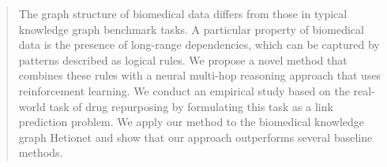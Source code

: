 \documentclass{article}
\begin{document}
\printAffiliationsAndNotice{\icmlEqualContribution} %


\begin{abstract}














The graph structure of biomedical data 
differs from those in typical knowledge graph benchmark tasks. A particular property of biomedical data is the presence of long-range dependencies, which can be captured by patterns described as logical rules. 
We propose a novel method that combines these rules with a neural multi-hop reasoning approach that uses  reinforcement learning. 
We conduct an empirical study based on the real-world task of drug repurposing by formulating this task as a link prediction problem.
We apply our method to the biomedical knowledge graph Hetionet and show that our approach outperforms several baseline methods.



\end{abstract}
\end{document}
